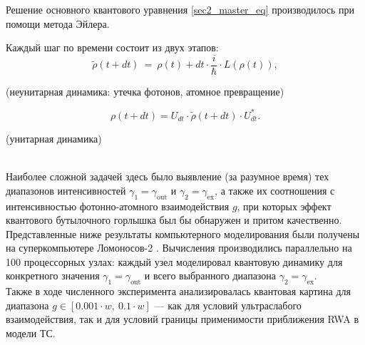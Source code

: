 \begin{enumerate}
{Решение основного квантового уравнения \eqref{sec2_master_eq} производилось при помощи метода Эйлера.

\clearpage
\begin{figure}[h!]
	\noindent{}
\end{figure}

\clearpage
Каждый шаг по времени состоит из двух этапов:
\[
\tilde{\rho}(t+dt)\ =\ \rho(t)+dt\cdot \frac{i}{\hbar}\cdot L(\rho(t)),
\]
\begin{center}
	\text(неунитарная динамика: утечка фотонов, атомное превращение)
\end{center}
\[
\rho(t+dt)=U_{dt}\cdot \tilde{\rho}(t+dt)\cdot U_{dt}^{*}.
\]
\begin{center}\text(унитарная динамика)\end{center}
\
\\
Наиболее сложной задачей здесь было выявление (за разумное время) тех диапазонов интенсивностей $\gamma_{1} = \gamma_{\text{out}}$ и
$\gamma_{2} = \gamma_{\text{ex}}$, а также их соотношения с интенсивностью фотонно-атомного взаимодействия $g$, при которых эффект квантового бутылочного горлышка был бы обнаружен и притом качественно.\\[12pt]

Представленные ниже результаты компьютерного моделирования были получены на суперкомпьютере Ломоносов-2 \cite{lomonosov_2}. Вычисления производились параллельно на 100 процессорных узлах: каждый узел моделировал квантовую динамику для конкретного значения $\gamma_{1} = \gamma_{\text{out}}$ и всего выбранного диапазона $\gamma_{2} = \gamma_{\text{ex}}$.\\[12pt]

Также в ходе численного эксперимента анализировалась квантовая картина для диапазона $g \in [0.001 \cdot w,~0.1 \cdot w]$ --- как для условий ультраслабого взаимодействия, так и для условий границы применимости приближения RWA \cite{ozhigov_qq,rwa_rabi_1,rwa_rabi_2} в модели ТС.
}
\end{enumerate}


